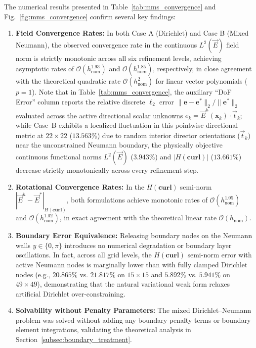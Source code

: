 \documentclass[preprint,12pt]{elsarticle}
\begin{document}
The numerical results presented in Table~\ref{tab:mms_convergence} and Fig.~\ref{fig:mms_convergence} confirm several key findings:
\begin{enumerate}
    \item \textbf{Field Convergence Rates:} In both Case A (Dirichlet) and Case B (Mixed Neumann), the observed convergence rate in the continuous $L^2(\vec{E})$ field norm is strictly monotonic across all six refinement levels, achieving asymptotic rates of $\mathcal{O}(h_{\mathrm{nom}}^{1.93})$ and $\mathcal{O}(h_{\mathrm{nom}}^{1.85})$, respectively, in close agreement with the theoretical quadratic rate $\mathcal{O}(h_{\mathrm{nom}}^2)$ for linear vector polynomials ($p=1$). Note that in Table~\ref{tab:mms_convergence}, the auxiliary ``DoF Error'' column reports the relative discrete $\ell_2$ error $\|\mathbf{e} - \mathbf{e}^*\|_2 / \|\mathbf{e}^*\|_2$ evaluated across the active directional scalar unknowns $e_k = \vec{E}^h(\mathbf{x}_k) \cdot \vec{t}_k$; while Case~B exhibits a localized fluctuation in this pointwise directional metric at $22 \times 22$ ($13.563\%$) due to random interior director orientations ($\vec{t}_k$) near the unconstrained Neumann boundary, the physically objective continuous functional norms $L^2(\vec{E})$ ($3.943\%$) and $|H(\mathbf{curl})|$ ($13.661\%$) decrease strictly monotonically across every refinement step.
    \item \textbf{Rotational Convergence Rates:} In the $H(\mathbf{curl})$ semi-norm $|\vec{E}^h - \vec{E}^*|_{H(\mathbf{curl})}$, both formulations achieve monotonic rates of $\mathcal{O}(h_{\mathrm{nom}}^{1.05})$ and $\mathcal{O}(h_{\mathrm{nom}}^{1.02})$, in exact agreement with the theoretical linear rate $\mathcal{O}(h_{\mathrm{nom}})$.
    \item \textbf{Boundary Error Equivalence:} Releasing boundary nodes on the Neumann walls $y \in \{0, \pi\}$ introduces no numerical degradation or boundary layer oscillations. In fact, across all grid levels, the $H(\mathbf{curl})$ semi-norm error with active Neumann nodes is marginally lower than with fully clamped Dirichlet nodes (e.g., $20.865\%$ vs. $21.817\%$ on $15 \times 15$ and $5.892\%$ vs. $5.941\%$ on $49 \times 49$), demonstrating that the natural variational weak form relaxes artificial Dirichlet over-constraining.
    \item \textbf{Solvability without Penalty Parameters:} The mixed Dirichlet--Neumann problem was solved without adding any boundary penalty terms or boundary element integrations, validating the theoretical analysis in Section~\ref{subsec:boundary_treatment}.

\end{enumerate}
\end{document}
